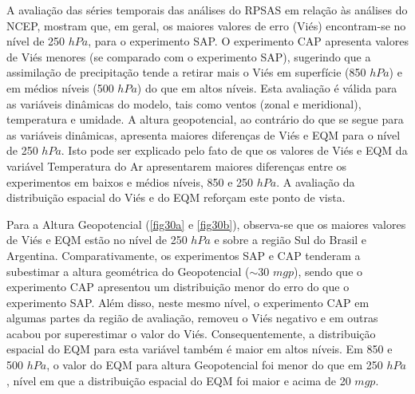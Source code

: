 A avaliação das séries temporais das análises do RPSAS em relação às análises do NCEP, mostram que, em geral, os maiores valores de erro (Viés) encontram-se no nível de 250 $hPa$, para o experimento SAP. O experimento CAP apresenta valores de Viés menores (se comparado com o experimento SAP), sugerindo que a assimilação de precipitação tende a retirar mais o Viés em superfície (850 $hPa$) e em médios níveis (500 $hPa$) do que em altos níveis. Esta avaliação é válida para as variáveis dinâmicas do modelo, tais como ventos (zonal e meridional), temperatura e umidade. A altura geopotencial, ao contrário do que se segue para as variáveis dinâmicas, apresenta maiores diferenças de Viés e EQM para o nível de 250 $hPa$. Isto pode ser explicado pelo fato de que os valores de Viés e EQM da variável Temperatura do Ar apresentarem maiores diferenças entre os experimentos em baixos e médios níveis, 850 e 250 $hPa$. A avaliação da distribuição espacial do Viés e do EQM reforçam este ponto de vista. 

Para a Altura Geopotencial (\autoref{fig30a} e \autoref{fig30b}), observa-se que os maiores valores de Viés e EQM estão no nível de 250 $hPa$ e sobre a região Sul do Brasil e Argentina. Comparativamente, os experimentos SAP e CAP tenderam a subestimar a altura geométrica do Geopotencial ($\sim$30 $mgp$), sendo que o experimento CAP apresentou um distribuição menor do erro do que o experimento SAP. Além disso, neste mesmo nível, o experimento CAP em algumas partes da região de avaliação, removeu o Viés negativo e em outras acabou por superestimar o valor do Viés. Consequentemente, a distribuição espacial do EQM para esta variável também é maior em altos níveis. Em 850 e 500 $hPa$, o valor do EQM para altura Geopotencial foi menor do que em 250 $hPa$, nível em que a distribuição espacial do EQM foi maior e acima de 20 $mgp$.

